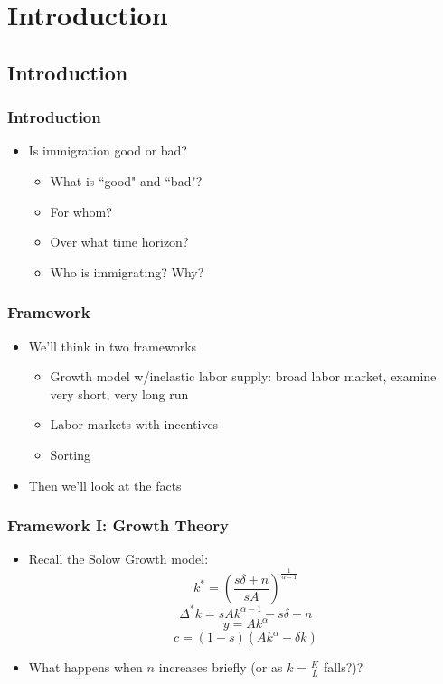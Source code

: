 \documentclass{beamer}
\date{}
\author{Trevor Gallen}
\begin{document}
\renewcommand*{\inserttotalframenumber}{\pageref{lastframe}}

\begin{frame}
\titlepage
\end{frame}


\section{Introduction}
\subsection{Introduction}
\begin{frame}
\frametitle{Introduction}
\begin{itemize}
\item Is immigration good or bad?
\bigskip
\begin{itemize}
\item<2-> What is ``good" and ``bad"?
\bigskip
\item<3-> For whom?
\bigskip
\item<4-> Over what time horizon?
\bigskip
\item<5-> Who is immigrating? Why?
\end{itemize}
\end{itemize}
\end{frame}


\begin{frame}
\frametitle{Framework}
\begin{itemize}
\item We'll think in two frameworks
\bigskip
\begin{itemize}
\item Growth model w/inelastic labor supply: broad labor market, examine very short, very long run
\bigskip
\item Labor markets with incentives
\bigskip
\item Sorting
\end{itemize}
\bigskip
\item Then we'll look at the facts
\end{itemize}
\end{frame}

\begin{frame}
\frametitle{Framework I: Growth Theory}
\begin{itemize}
\item Recall the Solow Growth model:
$$k^*  = \left(\frac{s\delta+n}{s A}\right)^\frac{1}{\alpha-1}$$
$$\Delta^* k = sAk^{\alpha-1}-s\delta-n$$
$$y=A k^\alpha$$
$$c=(1-s)(Ak^\alpha-\delta k) $$
\item What happens when $n$ increases briefly (or as $k=\frac{K}{L}$ falls?)?
\end{itemize}
\end{frame}
\end{document}
